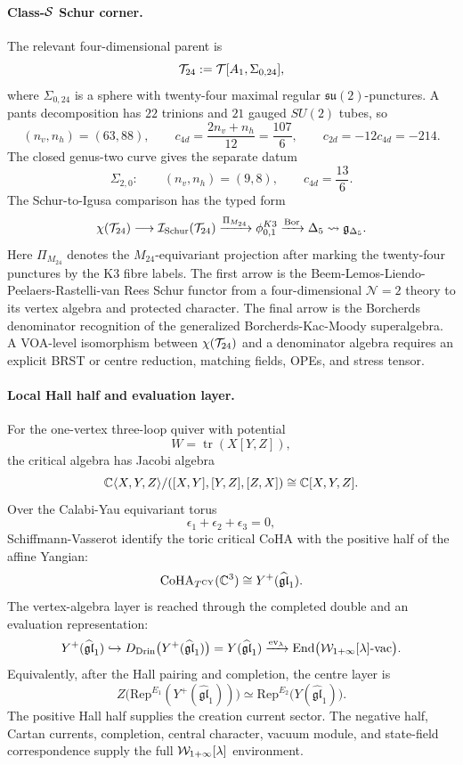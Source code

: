 \paragraph{Class-\texorpdfstring{$\mathcal{S}$}{S} Schur corner.}
The relevant four-dimensional parent is
\[
 \mathcal{T}_{24}:=\mathcal{T}[A_1,\Sigma_{0,24}],
\]
where \(\Sigma_{0,24}\) is a sphere with twenty-four maximal regular
\(\mathfrak{su}(2)\)-punctures.  A pants decomposition has \(22\)
trinions and \(21\) gauged \(SU(2)\) tubes, so
\[
 (n_v,n_h)=(63,88),\qquad
 c_{4d}=\frac{2n_v+n_h}{12}=\frac{107}{6},\qquad
 c_{2d}=-12c_{4d}=-214 .
\]
The closed genus-two curve gives the separate datum
\[
 \Sigma_{2,0}:\qquad (n_v,n_h)=(9,8),\qquad c_{4d}=\frac{13}{6}.
\]
The Schur-to-Igusa comparison has the typed form
\[
 \chi(\mathcal{T}_{24})
 \longrightarrow
 \mathcal{I}_{\mathrm{Schur}}(\mathcal{T}_{24})
 \xrightarrow{\Pi_{M_{24}}}
 \phi_{0,1}^{K3}
 \xrightarrow{\operatorname{Bor}}
 \Delta_5
 \rightsquigarrow
 \mathfrak{g}_{\Delta_5}.
\]
Here \(\Pi_{M_{24}}\) denotes the \(M_{24}\)-equivariant projection after
marking the twenty-four punctures by the K3 fibre labels.  The first
arrow is the Beem-Lemos-Liendo-Peelaers-Rastelli-van Rees Schur functor
from a four-dimensional \(\mathcal N=2\) theory to its vertex algebra and
protected character.  The final arrow is the Borcherds denominator
recognition of the generalized Borcherds-Kac-Moody superalgebra.  A
VOA-level isomorphism between \(\chi(\mathcal{T}_{24})\) and a denominator
algebra requires an explicit BRST or centre reduction, matching fields,
OPEs, and stress tensor.

\paragraph{Local Hall half and evaluation layer.}
For the one-vertex three-loop quiver with potential
\[
 W=\operatorname{tr}(X[Y,Z]),
\]
the critical algebra has Jacobi algebra
\[
 \mathbb{C}\langle X,Y,Z\rangle/([X,Y],[Y,Z],[Z,X])\cong\mathbb{C}[X,Y,Z].
\]
Over the Calabi-Yau equivariant torus
\[
 \epsilon_1+\epsilon_2+\epsilon_3=0,
\]
Schiffmann-Vasserot identify the toric critical CoHA with the positive
half of the affine Yangian:
\[
 \mathrm{CoHA}_{T^{\mathrm{CY}}}(\mathbb{C}^3)\cong Y^+(\widehat{\mathfrak{gl}}_1).
\]
The vertex-algebra layer is reached through the completed double and an
evaluation representation:
\[
 Y^+(\widehat{\mathfrak{gl}}_1)
 \hookrightarrow
 D_{\mathrm{Drin}}\bigl(Y^+(\widehat{\mathfrak{gl}}_1)\bigr)
 =Y(\widehat{\mathfrak{gl}}_1)
 \xrightarrow{\mathrm{ev}_\lambda}
\operatorname{End}\bigl(\mathcal{W}_{1+\infty}[\lambda]\text{-}\mathrm{vac}\bigr).
\]
Equivalently, after the Hall pairing and completion, the centre layer is
\[
 Z\bigl(\mathrm{Rep}^{E_1}(Y^+(\widehat{\mathfrak{gl}}_1))\bigr)
 \simeq
 \mathrm{Rep}^{E_2}\bigl(Y(\widehat{\mathfrak{gl}}_1)\bigr).
\]
The positive Hall half supplies the creation current sector.  The
negative half, Cartan currents, completion, central character, vacuum
module, and state-field correspondence supply the full
\(\mathcal{W}_{1+\infty}[\lambda]\) environment.

